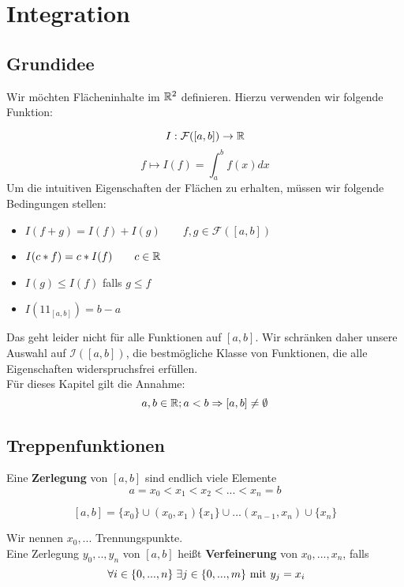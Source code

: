 \documentclass[main.tex]{subfiles}
\begin{document}
\chapter{Integration}


\section{Grundidee}

Wir möchten Flächeninhalte im $\mathbb{R}^2$ definieren. Hierzu verwenden wir folgende Funktion:

\begin{Definition}
  $$I: \mathcal{F}([a,b]) \to \mathbb{R}$$
  $$f \mapsto I(f) = \int_a^b f(x) dx$$
  Um die intuitiven Eigenschaften der Flächen zu erhalten, müssen wir folgende Bedingungen stellen:
  \begin{itemize}
    \item $I(f+g) = I(f)+I(g) \qquad f,g \in \mathcal{F}([a,b])$
    \item $I(c * f) = c * I(f) \qquad c \in \mathbb{R}$
    \item $I(g) \leq I(f)$ falls $g \leq f$
    \item $I(1\!\!1_{[a,b]}) = b-a$
  \end{itemize}
\end{Definition}

Das geht leider nicht für alle Funktionen auf $[a,b]$. Wir schränken daher unsere Auswahl auf $\mathcal{I}([a,b])$, die bestmögliche Klasse von Funktionen, die alle Eigenschaften widerspruchsfrei erfüllen.\\
Für dieses Kapitel gilt die Annahme:
$$a,b \in \mathbb{R}; a < b \Rightarrow [a,b] \neq \emptyset$$


\section{Treppenfunktionen}

\begin{Definition}[Zerlegung]
  Eine \textbf{Zerlegung} von $[a,b]$ sind endlich viele Elemente
  $$a = x_0 < x_1 < x_2 < ... < x_n = b$$
  \begin{Theorem}
    $$[a,b] = \{x_0\} \cup (x_0,x_1) \{x_1\} \cup ... (x_{n-1},x_n) \cup \{x_n\}$$
  \end{Theorem}
  Wir nennen $x_0 , ...$ Trennungspunkte.\\
  Eine Zerlegung $y_0,..,y_n$ von $[a,b]$ heißt \textbf{Verfeinerung} von $x_0,...,x_n$, falls
  $$\;\forall i \in \{0,...,n\} \;\exists j \in \{0,...,m\} \text{ mit } y_j = x_i$$
\end{Definition}
\end{document}
